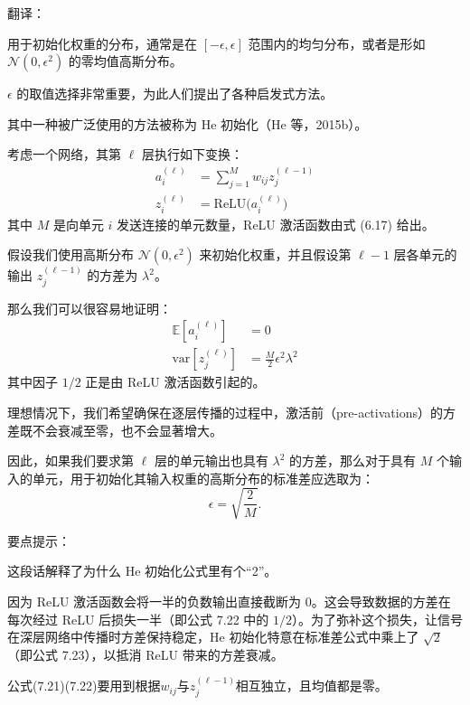 \documentclass{article}
\begin{document}
{\color{red}
翻译：

用于初始化权重的分布，通常是在 $[-\epsilon,\epsilon]$ 范围内的均匀分布，或者是形如 $\mathcal{N}(0,\epsilon^2)$ 的零均值高斯分布。

$\epsilon$ 的取值选择非常重要，为此人们提出了各种启发式方法。

其中一种被广泛使用的方法被称为 He 初始化（He 等，2015b）。

考虑一个网络，其第 $\ell$ 层执行如下变换：
\begin{align}
a_i^{(\ell)} &= \sum_{j=1}^{M} w_{ij} z_j^{(\ell-1)} \tag{7.19} \\
z_i^{(\ell)} &= \mathrm{ReLU}\bigl(a_i^{(\ell)}\bigr) \tag{7.20}
\end{align}
其中 $M$ 是向单元 $i$ 发送连接的单元数量，ReLU 激活函数由式 (6.17) 给出。

假设我们使用高斯分布 $\mathcal{N}(0,\epsilon^2)$ 来初始化权重，并且假设第 $\ell-1$ 层各单元的输出 $z_j^{(\ell-1)}$ 的方差为 $\lambda^2$。

那么我们可以很容易地证明：
\begin{align}
\mathbb{E}[a_i^{(\ell)}] &= 0 \tag{7.21} \\
\mathrm{var}[z_j^{(\ell)}] &= \frac{M}{2} \epsilon^2 \lambda^2 \tag{7.22}
\end{align}
其中因子 $1/2$ 正是由 ReLU 激活函数引起的。

理想情况下，我们希望确保在逐层传播的过程中，激活前（pre-activations）的方差既不会衰减至零，也不会显著增大。

因此，如果我们要求第 $\ell$ 层的单元输出也具有 $\lambda^2$ 的方差，那么对于具有 $M$ 个输入的单元，用于初始化其输入权重的高斯分布的标准差应选取为：
\begin{equation}
\epsilon = \sqrt{\frac{2}{M}}.
\tag{7.23}
\end{equation}
}

{\color{blue}
要点提示：

这段话解释了为什么 He 初始化公式里有个“2”。

因为 ReLU 激活函数会将一半的负数输出直接截断为 0。这会导致数据的方差在每次经过 ReLU 后损失一半（即公式 7.22 中的 $1/2$）。为了弥补这个损失，让信号在深层网络中传播时方差保持稳定，He 初始化特意在标准差公式中乘上了 $\sqrt{2}$（即公式 7.23），以抵消 ReLU 带来的方差衰减。

公式(7.21)(7.22)要用到根据$w_{ij}$与$z_j^{(\ell-1)}$相互独立，且均值都是零。


}
\end{document}
